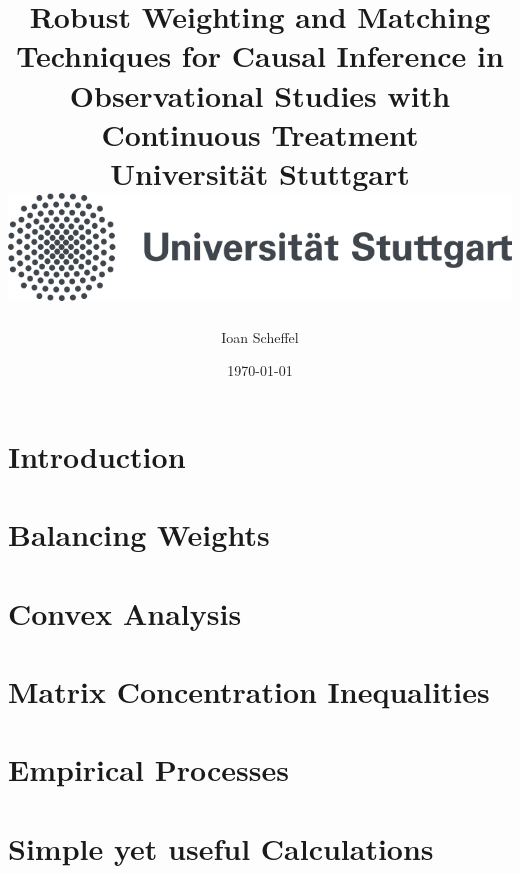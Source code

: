 \documentclass[12pt]{report}
\title{
  {
    Robust Weighting and Matching Techniques for Causal Inference in Observational Studies with Continuous Treatment
  }
  \\
  {\large Universität Stuttgart}
  \\
  {\includegraphics{unistuttgart_logo_deutsch.jpg}}
}
\author{Ioan Scheffel}
\date{\today}
\begin{document}
\maketitle

\tableofcontents 

\chapter{Introduction}


\chapter{Balancing Weights}


\chapter{Convex Analysis}


\chapter{Matrix Concentration Inequalities}


\chapter{Empirical Processes}


\chapter{Simple yet useful Calculations}




{}

\end{document}
